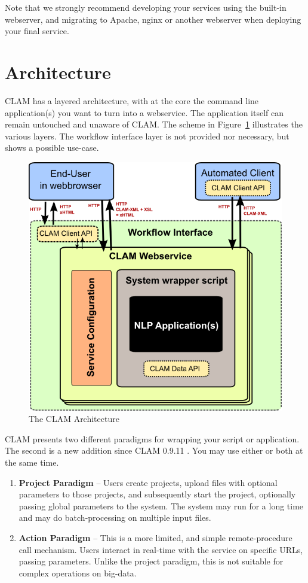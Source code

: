 \documentclass[a4paper,12pt,twoside,openright]{report}
\begin{document}
Note that we strongly recommend developing your services using the built-in
webserver, and migrating to Apache, nginx or another webserver when deploying
your final service.

\section{Architecture}

CLAM has a layered architecture, with at the core the command line
application(s) you want to turn into a webservice. The application itself can
remain untouched and unaware of CLAM. The scheme in Figure~\ref{fig:arch}
illustrates the various layers.  The workflow interface layer is not provided
nor necessary, but shows a possible use-case.

\begin{figure}[h] \begin{center}
\includegraphics[width=130.0mm]{architecture.png}
\end{center}
\caption{The CLAM Architecture}
\label{fig:arch} 
\end{figure}

CLAM presents two different paradigms for wrapping your script or application.
The second is a new addition since CLAM 0.9.11 . You may use either or both at
the same time.

\begin{enumerate}
  \item \textbf{Project Paradigm} -- Users create projects, upload files with
    optional parameters to those projects, and subsequently start the project,
    optionally passing global parameters to the system. The system may run for
    a long time and may do batch-processing on multiple input files. 
  \item \textbf{Action Paradigm} -- This is a more limited, and simple
    remote-procedure call mechanism. Users interact in real-time with the service on
    specific URLs, passing parameters. Unlike the project paradigm, this is not
    suitable for complex operations on big-data.
\end{enumerate}
\end{document}
